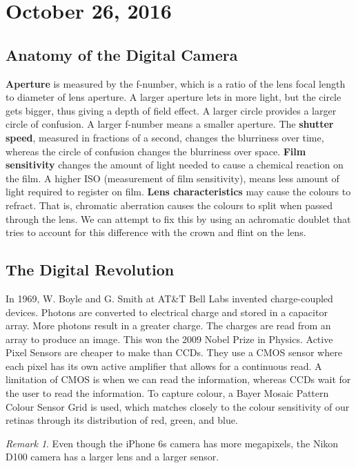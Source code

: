 \documentclass[11pt]{article}
\theoremstyle{plain} %
\theoremstyle{definition}
\theoremstyle{example}
\theoremstyle{remark}
\newtheorem*{remark}{Remark}
\begin{document}
\section{October 26, 2016}
\subsection{Anatomy of the Digital Camera}

 \textbf{Aperture} is measured by the f-number, which is a ratio of the lens focal length to diameter of lens aperture. A larger aperture lets in more light, but the circle gets bigger, thus giving a depth of field effect. A larger circle provides a larger circle of confusion. A larger f-number means a smaller aperture. The \textbf{shutter speed}, measured in fractions of a second, changes the blurriness over time, whereas the circle of confusion changes the blurriness over space. \textbf{Film sensitivity} changes the amount of light needed to cause a chemical reaction on the film. A higher ISO (measurement of film sensitivity), means less amount of light required to register on film. \textbf{Lens characteristics} may cause the colours to refract. That is, chromatic aberration causes the colours to split when passed through the lens. We can attempt to fix this by using an achromatic doublet that tries to account for this difference with the crown and flint on the lens. 

\subsection{The Digital Revolution}

In 1969, W. Boyle and G. Smith at AT\&T Bell Labs invented charge-coupled devices. Photons are converted to electrical charge and stored in a capacitor array. More photons result in a greater charge. The charges are read from an array to produce an image. This won the 2009 Nobel Prize in Physics. Active Pixel Sensors are cheaper to make than CCDs. They use a CMOS sensor where each pixel has its own active amplifier that allows for a continuous read. A limitation of CMOS is when we can read the information, whereas CCDs wait for the user to read the information. To capture colour, a Bayer Mosaic Pattern Colour Sensor Grid is used, which matches closely to the colour sensitivity of our retinas through its distribution of red, green, and blue.

\begin{remark}Even though the iPhone 6s camera has more megapixels, the Nikon D100 camera has a larger lens and a larger sensor.
\end{remark}
\end{document}
